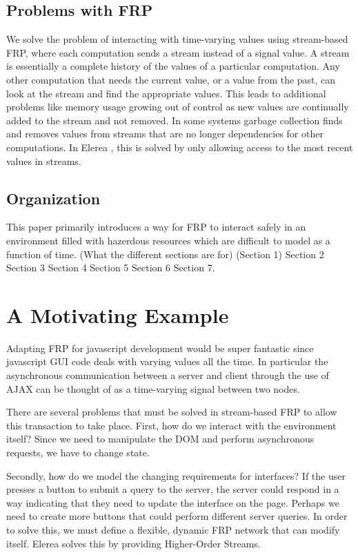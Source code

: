 \documentclass[twocolumn,11pt,english]{article}
\begin{document}
\subsection{Problems with FRP}
We solve the problem of interacting with time-varying values using stream-based FRP, where each computation sends a stream instead of a signal value. A stream is essentially a complete history of the values of a particular computation. Any other computation that needs the current value, or a value from the past, can look at the stream and find the appropriate values. This leads to additional problems like memory usage growing out of control as new values are continually added to the stream and not removed. In some systems garbage collection finds and removes values from streams that are no longer dependencies for other computations. In Elerea \cite{HighOrderStreams}, this is solved by only allowing access to the most recent values in streams. 


\subsection{Organization}
This paper primarily introduces a way for FRP to interact safely in an environment filled with hazerdous resources which are difficult to model as a function of time. (What the different sections are for) (Section 1) Section 2 Section 3 Section 4 Section 5 Section 6 Section 7.

\section{A Motivating Example}
Adapting FRP for javascript development would be super fantastic since javascript GUI code deals with varying values all the time. In particular the asynchronous communication between a server and client through the use of AJAX can be thought of as a time-varying signal between two nodes. 

There are several problems that must be solved in stream-based FRP to allow this transaction to take place. First, how do we interact with the environment itself? Since we need to manipulate the DOM and perform asynchronous requests, we have to change state. 

Secondly, how do we model the changing requirements for interfaces? If the user presses a button to submit a query to the server, the server could respond in a way indicating that they need to update the interface on the page. Perhaps we need to create more buttons that could perform different server queries. In order to solve this, we must define a flexible, dynamic FRP network that can modify itself. Elerea solves this by providing Higher-Order Streams. 
\end{document}
